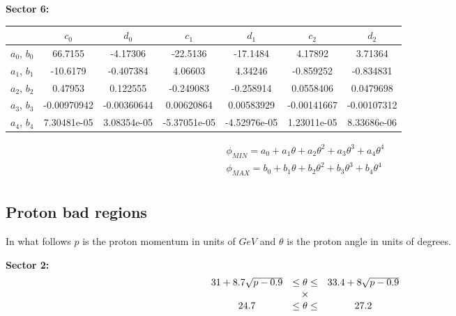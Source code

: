 \clearpage


{\bf Sector 6:}
\begin{table}[h]
\scriptsize
 \begin{center}
  \begin{tabular}{c|c|c|c|c|c|c}
    \hline 
    & $c_0$ & $d_0$ & $c_1$ & $d_1$     & $c_2$ & $d_2$ \\
    \hline  
   $a_0$, $b_0$ &  66.7155  &  -4.17306  &  -22.5136  &  -17.1484  &  4.17892  &  3.71364  \\
   $a_1$, $b_1$ &    -10.6179  &  -0.407384  &  4.06603  &  4.34246  &  -0.859252  &  -0.834831  \\
   $a_2$, $b_2$ &  0.47953  &  0.122555  &  -0.249083  &  -0.258914 &   0.0558406  &  0.0479698  \\
   $a_3$, $b_3$ &   -0.00970942  &  -0.00360644  &  0.00620864  &  0.00583929  &  -0.00141667  &  -0.00107312  \\
   $a_4$, $b_4$ &   7.30481e-05  &  3.08354e-05  &  -5.37051e-05  &  -4.52976e-05  &  1.23011e-05  &  8.33686e-06  \\
 \hline
  \end{tabular}
 \end{center} 
\end{table}





$$
\begin{array}{c}
 \phi_{MIN} = a_0 + a_1\theta + a_2\theta^2 + a_3\theta^3 + a_4\theta^4 \\
 \phi_{MAX} = b_0 + b_1\theta + b_2\theta^2 + b_3\theta^3 + b_4\theta^4 \\ 
\end{array}
$$





\subsection{Proton bad regions}

In what follows $p$ is the proton momentum in units of $GeV$ and $\theta$ is the
proton angle in units of degrees.

\vspace{0.7cm}
{\bf Sector 2:}
$$
\begin{array}{c c c}
31 +8.7\sqrt{p-0.9} & \le \theta \le  & 33.4+8\sqrt{p-0.9} \\
& \times & \\
24.7 & \le \theta \le & 27.2 \\
\end{array}
$$

